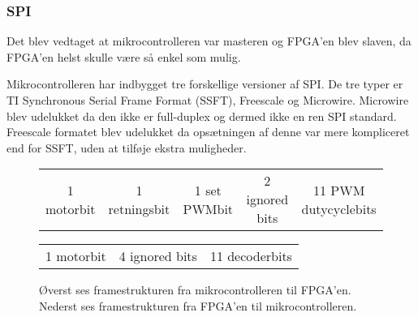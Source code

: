 \subsubsection{SPI}
\label{sec:spi-implementering}
Det blev vedtaget at mikrocontrolleren var masteren og FPGA'en blev slaven, da FPGA'en helst skulle være så enkel som mulig.

Mikrocontrolleren har indbygget tre forskellige versioner af SPI. De tre typer er TI Synchronous Serial Frame Format (SSFT), Freescale og Microwire. 
Microwire blev udelukket da den ikke er full-duplex og dermed ikke en ren SPI standard. 
Freescale formatet blev udelukket da opsætningen af denne var mere kompliceret end for SSFT, uden at tilføje ekstra muligheder.


\begin{figure}[th!]
\centering
\begin{tabular}{c|c|c|c|c}
1 motorbit &1 retningsbit & 1 set PWMbit & 2 ignored bits & 11 PWM dutycyclebits\\
\end{tabular}
 \begin{tabular}{c|c|c}
 1 motorbit & 4 ignored bits & 11 decoderbits
 \end{tabular}
\captionsetup{type=figure}
\caption[SPI framestruktur]{Øverst ses framestrukturen fra mikrocontrolleren til FPGA'en. Nederst ses framestrukturen fra FPGA'en til mikrocontrolleren.}
\label{tb:protokol1}
\end{figure}


